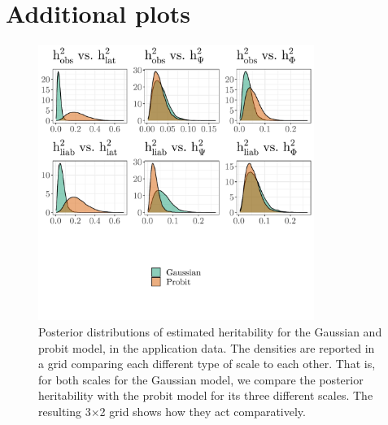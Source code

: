 \chapter{Additional plots}

\begin{figure}
    \centering
    \includegraphics[width=0.8\textwidth]{figures/grid_application_gaussian_vs_binom.pdf}
    \caption[Posterior heritability for application data in different scales]{Posterior distributions of estimated heritability for the Gaussian and probit model, in the application data. The densities are reported in a grid comparing each different type of scale to each other. That is, for both scales for the Gaussian model, we compare the posterior heritability with the probit model for its three different scales. The resulting 3$\times$2 grid shows how they act comparatively.}
    \label{fig:application gaussian vs binomial}
\end{figure}

